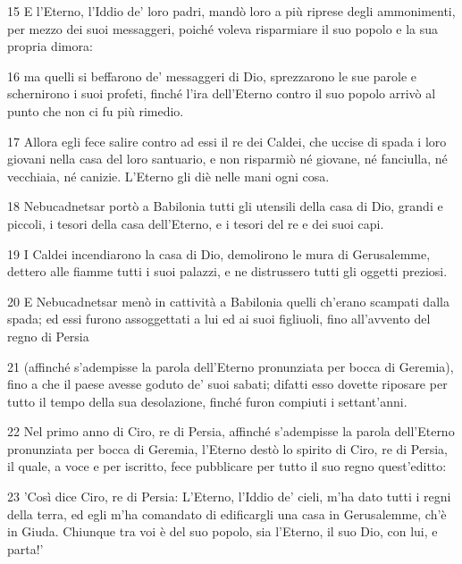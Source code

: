 \par 15 E l'Eterno, l'Iddio de' loro padri, mandò loro a più riprese degli ammonimenti, per mezzo dei suoi messaggeri, poiché voleva risparmiare il suo popolo e la sua propria dimora:
\par 16 ma quelli si beffarono de' messaggeri di Dio, sprezzarono le sue parole e schernirono i suoi profeti, finché l'ira dell'Eterno contro il suo popolo arrivò al punto che non ci fu più rimedio.
\par 17 Allora egli fece salire contro ad essi il re dei Caldei, che uccise di spada i loro giovani nella casa del loro santuario, e non risparmiò né giovane, né fanciulla, né vecchiaia, né canizie. L'Eterno gli diè nelle mani ogni cosa.
\par 18 Nebucadnetsar portò a Babilonia tutti gli utensili della casa di Dio, grandi e piccoli, i tesori della casa dell'Eterno, e i tesori del re e dei suoi capi.
\par 19 I Caldei incendiarono la casa di Dio, demolirono le mura di Gerusalemme, dettero alle fiamme tutti i suoi palazzi, e ne distrussero tutti gli oggetti preziosi.
\par 20 E Nebucadnetsar menò in cattività a Babilonia quelli ch'erano scampati dalla spada; ed essi furono assoggettati a lui ed ai suoi figliuoli, fino all'avvento del regno di Persia
\par 21 (affinché s'adempisse la parola dell'Eterno pronunziata per bocca di Geremia), fino a che il paese avesse goduto de' suoi sabati; difatti esso dovette riposare per tutto il tempo della sua desolazione, finché furon compiuti i settant'anni.
\par 22 Nel primo anno di Ciro, re di Persia, affinché s'adempisse la parola dell'Eterno pronunziata per bocca di Geremia, l'Eterno destò lo spirito di Ciro, re di Persia, il quale, a voce e per iscritto, fece pubblicare per tutto il suo regno quest'editto:
\par 23 'Così dice Ciro, re di Persia: L'Eterno, l'Iddio de' cieli, m'ha dato tutti i regni della terra, ed egli m'ha comandato di edificargli una casa in Gerusalemme, ch'è in Giuda. Chiunque tra voi è del suo popolo, sia l'Eterno, il suo Dio, con lui, e parta!'


